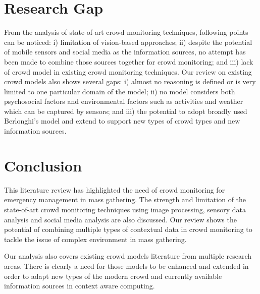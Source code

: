 \section{Research Gap}
From the analysis of state-of-art crowd monitoring techniques, following points can be noticed: i) limitation of vision-based approaches; ii) despite the potential of mobile sensors and social media as the information sources, no attempt has been made to combine those sources together for crowd monitoring; and iii) lack of crowd model in existing crowd monitoring techniques.
Our review on existing crowd models also shows several gaps: i) almost no reasoning is defined or is very limited to one particular domain of the model; ii) no model considers both psychosocial factors and environmental factors such as activities and weather which can be captured by sensors; and iii) the potential to adopt broadly used Berlonghi’s model and extend to support new types of crowd types and new information sources.

\section{Conclusion}
This literature review has highlighted the need of crowd monitoring for emergency management in mass gathering. The strength and limitation of the state-of-art crowd monitoring techniques using image processing, sensory data analysis and social media analysis are also discussed. Our review shows the potential of combining multiple types of contextual data in crowd monitoring to tackle the issue of complex environment in mass gathering.

Our analysis also covers existing crowd models literature from multiple research areas. There is clearly a need for those models to be enhanced and extended in order to adapt new types of the modern crowd and currently available information sources in context aware computing.